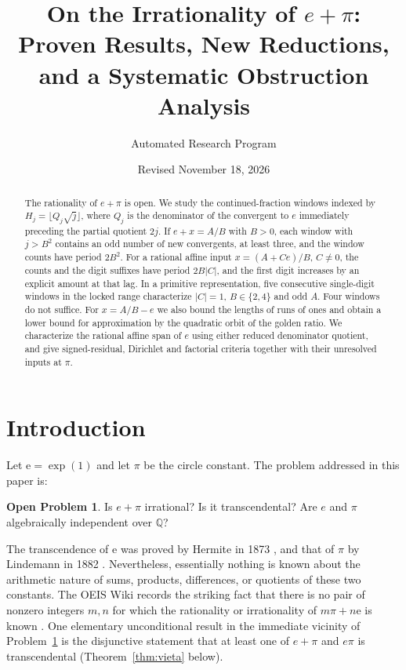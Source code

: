 \documentclass[11pt]{amsart}
\title[On the Irrationality of $e+\pi$]{On the Irrationality of $e+\pi$: Proven Results, New Reductions, and a Systematic Obstruction Analysis}
\author{Automated Research Program}
\date{Revised November 18, 2026}
\theoremstyle{definition}
\newtheorem{problem}[theorem]{Open Problem}
\theoremstyle{remark}
\numberwithin{equation}{section}
\newcommand{\Q}{\mathbb{Q}}
\newcommand{\ee}{\mathrm{e}}
\begin{document}
\begin{abstract}
The rationality of $e+\pi$ is open. We study the continued-fraction
windows indexed by $H_j=\lfloor Q_j\sqrt j\rfloor$, where $Q_j$ is the
denominator of the convergent to $e$ immediately preceding the partial
quotient $2j$. If $e+x=A/B$ with $B>0$, each window with $j>B^2$
contains an odd number of new convergents, at least three, and the
window counts have period $2B^2$. For a rational affine input
$x=(A+Ce)/B$, $C\ne0$, the counts and the digit suffixes have period
$2B|C|$, and the first digit increases by an explicit amount at that lag.
In a primitive representation, five consecutive single-digit windows
in the locked range characterize $|C|=1$, $B\in\{2,4\}$ and odd $A$.
Four windows do not suffice. For $x=A/B-e$ we also bound the lengths
of runs of ones and obtain a lower bound for approximation by the
quadratic orbit of the golden ratio. We characterize the rational affine span of $e$ using
either reduced denominator quotient, and give signed-residual,
Dirichlet and factorial criteria together with their unresolved inputs
at $\pi$.
\end{abstract}

\maketitle

\section{Introduction}\label{sec:intro}

Let $\ee=\exp(1)$ and let $\pi$ be the circle constant. The problem addressed in this paper is:

\begin{problem}\label{prob:main}
Is $e+\pi$ irrational? Is it transcendental? Are $e$ and $\pi$ algebraically independent over $\Q$?
\end{problem}

The transcendence of $\ee$ was proved by Hermite in 1873 \cite{Hermite1873}, and that of $\pi$ by Lindemann in 1882 \cite{Lindemann1882}. Nevertheless, essentially nothing is known about the arithmetic nature of sums, products, differences, or quotients of these two constants. The OEIS Wiki records the striking fact that there is no pair of nonzero integers $m,n$ for which the rationality or irrationality of $m\pi+n\ee$ is known \cite{OEIS}. One elementary unconditional result in the immediate vicinity of Problem~\ref{prob:main} is the disjunctive statement that at least one of $e+\pi$ and $e\pi$ is transcendental (Theorem~\ref{thm:vieta} below).
\end{document}
